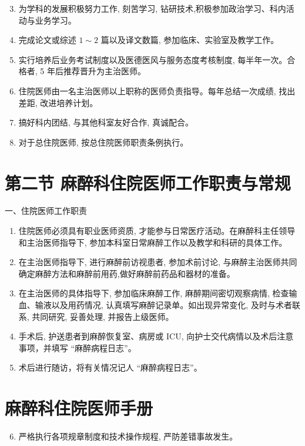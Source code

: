 \documentclass[10pt]{article}
\begin{document}
\begin{enumerate}
  \setcounter{enumi}{2}
  \item 为学科的发展积极努力工作, 刻苦学习, 钻研技术,积极参加政治学习、科内活动与业务学习。

  \item 完成论文或综述 $1 \sim 2$ 篇以及译文数篇, 参加临床、实验室及教学工作。

  \item 实行培养后业务考试制度以及医德医风与服务态度考核制度, 每半年一次。合格者, 5 年后推荐晋升为主治医师。

  \item 住院医师由一名主治医师以上职称的医师负责指导。每年总结一次成绩, 找出差距, 改进培养计划。

  \item 搞好科内团结, 与其他科室友好合作, 真诚配合。

  \item 对于总住院医师, 按总住院医师职责条例执行。

\end{enumerate}

\section*{第二节 麻醉科住院医师工作职责与常规}
一、住院医师工作职责

\begin{enumerate}
  \item 住院医师必须具有职业医师资质, 才能参与日常医疗活动。在麻醉科主任领导和主治医师指导下, 参加本科室日常麻醉工作以及教学和科研的具体工作。

  \item 在主治医师指导下, 进行麻醉前访视患者, 参加术前讨论, 与麻醉主治医师共同确定麻醉方法和麻醉前用药,做好麻醉前药品和器材的准备。

  \item 在主治医师的具体指导下, 参加临床麻醉工作, 麻醉期间密切观察病情, 检查输血、输液以及用药情况, 认真填写麻醉记录单。如出现异常变化, 及时与术者联系, 共同研究, 妥善处理, 并报告上级医师。

  \item 手术后, 护送患者到麻醉恢复室、病房或 ICU, 向护士交代病情以及术后注意事项，并填写 “麻醉病程日志”。

  \item 术后进行随访，将有关情况记人 “麻醉病程日志”。

\end{enumerate}

\section*{麻醉科住院医师手册}
\begin{enumerate}
  \setcounter{enumi}{5}
  \item 严格执行各项规章制度和技术操作规程, 严防差错事故发生。
\end{enumerate}
\end{document}
